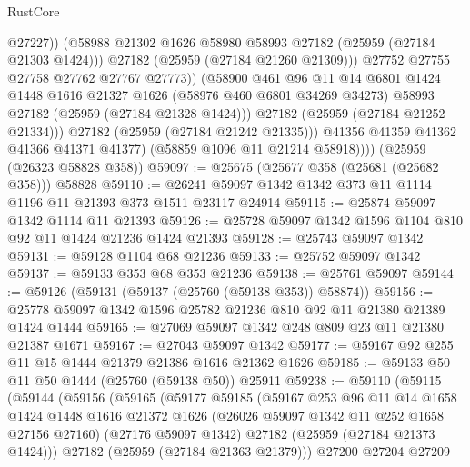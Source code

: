 \begin{lexlean}{RustCore}
\begin{coremodule}
                          @27227))
                      (@58988 @21302 @1626 @58980 @58993 @27182 (@25959 (@27184 @21303 @1424)))
                      @27182
                      (@25959 (@27184 @21260 @21309)))
                    @27752
                    @27755
                    @27758
                    @27762
                    @27767
                    @27773))
                (@58900
                  @461
                  @96
                  @11
                  @14
                  @6801
                  @1424
                  @1448
                  @1616
                  @21327
                  @1626
                  (@58976 @460 @6801 @34269 @34273)
                  @58993
                  @27182
                  (@25959 (@27184 @21328 @1424)))
                @27182
                (@25959 (@27184 @21252 @21334)))
              @27182
              (@25959 (@27184 @21242 @21335)))
            @41356
            @41359
            @41362
            @41366
            @41371
            @41377)
          (@58859 @1096 @11 @21214 @58918))))
    (@25959 (@26323 @58828 @358))
@59097 := @25675 (@25677 @358 (@25681 (@25682 @358))) @58828
@59110 := @26241 @59097 @1342 @1342 @373 @11 @1114 @1196 @11 @21393 @373 @1511 @23117 @24914
@59115 := @25874 @59097 @1342 @1114 @11 @21393
@59126 := @25728 @59097 @1342 @1596 @1104 @810 @92 @11 @1424 @21236 @1424 @21393
@59128 := @25743 @59097 @1342
@59131 := @59128 @1104 @68 @21236
@59133 := @25752 @59097 @1342
@59137 := @59133 @353 @68 @353 @21236
@59138 := @25761 @59097
@59144 := @59126 (@59131 (@59137 (@25760 (@59138 @353)) @58874))
@59156 := @25778 @59097 @1342 @1596 @25782 @21236 @810 @92 @11 @21380 @21389 @1424 @1444
@59165 := @27069 @59097 @1342 @248 @809 @23 @11 @21380 @21387 @1671
@59167 := @27043 @59097 @1342
@59177 := @59167 @92 @255 @11 @15 @1444 @21379 @21386 @1616 @21362 @1626
@59185 := @59133 @50 @11 @50 @1444 (@25760 (@59138 @50)) @25911
@59238 := @59110
    (@59115
      (@59144
        (@59156
          (@59165
            (@59177
              @59185
              (@59167
                @253
                @96
                @11
                @14
                @1658
                @1424
                @1448
                @1616
                @21372
                @1626
                (@26026 @59097 @1342 @11 @252 @1658 @27156 @27160)
                (@27176 @59097 @1342)
                @27182
                (@25959 (@27184 @21373 @1424)))
              @27182
              (@25959 (@27184 @21363 @21379)))
            @27200
            @27204
            @27209

\end{coremodule}
\end{lexlean}
